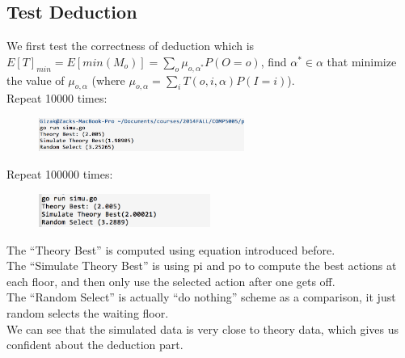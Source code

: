 \documentclass[11pt]{article}
\begin{document}
\subsection{Test Deduction}
We first test the correctness of deduction which is $E[T]_{min}=E[min(M_o)]=\sum_o\mu_{o,\alpha^*}P(O=o)$, find $\alpha^* \in \alpha$ that minimize the value of $\mu_{o,\alpha}$ (where $\mu_{o,\alpha} = \sum_iT(o,i,\alpha)P(I=i)$).\\

Repeat 10000 times:
\begin{figure}[H]
\includegraphics[width=0.6\textwidth]{p2.png}
\end{figure}

Repeat 100000 times:
\begin{figure}[H]
\includegraphics[width=0.5\textwidth]{p3.png}
\end{figure}

The ``Theory Best'' is computed using equation introduced before.\\

The ``Simulate Theory Best'' is using pi and po to compute the best actions at each floor, and then only use the selected action after one gets off.\\

The ``Random Select'' is actually ``do nothing'' scheme as a comparison, it just random selects the waiting floor.\\

We can see that the simulated data is very close to theory data, which gives us confident about the deduction part.
\end{document}
